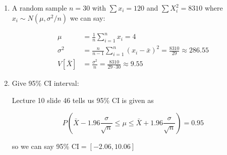\documentclass{article}
\newcommand{\1}{\mathbf{1}}
\begin{document}
\begin{enumerate}
    \item A random sample $n=30$ with $\sum x_i = 120$ and $\sum X_i^2 = 8310$ where $x_i\sim N(\mu, \sigma^2/n)$ we can say: 
    
    \begin{align*}
        \mu &= \frac{1}{n} \sum_{i=1}^n x_i = 4 \\
        \sigma^2 &= \frac{n}{n-1} \sum_{i=1}^n (x_i - \bar x)^2 = \frac{8310}{29} \approx 286.55 \\
        V[\bar X] &= \frac{\sigma^2}{n} = \frac{8310}{29\cdot 30} \approx 9.55
    \end{align*}
    
    \item Give 95\% CI interval:
    
    Lecture 10 slide 46 tells us 95\% CI is given as
    
    $$ P\left(\bar X - 1.96\frac{\sigma}{\sqrt n} \leq \mu \leq \bar X + 1.96\frac{\sigma}{\sqrt n}\right) = 0.95 $$
    
    so we can say 95\% CI$=[-2.06, 10.06]$ 
\end{enumerate}
\end{document}

